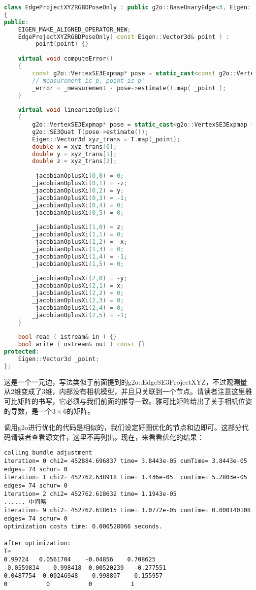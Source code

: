 \begin{lstlisting}[language=c++,caption=slambook/ch7/pose\_estimation\_3d3d.cpp]
class EdgeProjectXYZRGBDPoseOnly : public g2o::BaseUnaryEdge<3, Eigen::Vector3d, g2o::VertexSE3Expmap>
{
public:
	EIGEN_MAKE_ALIGNED_OPERATOR_NEW;
	EdgeProjectXYZRGBDPoseOnly( const Eigen::Vector3d& point ) :
		_point(point) {}
	
	virtual void computeError()
	{
		const g2o::VertexSE3Expmap* pose = static_cast<const g2o::VertexSE3Expmap*> ( _vertices[0] );
		// measurement is p, point is p'
		_error = _measurement - pose->estimate().map( _point );
	}
	
	virtual void linearizeOplus()
	{
		g2o::VertexSE3Expmap* pose = static_cast<g2o::VertexSE3Expmap *>(_vertices[0]);
		g2o::SE3Quat T(pose->estimate());
		Eigen::Vector3d xyz_trans = T.map(_point);
		double x = xyz_trans[0];
		double y = xyz_trans[1];
		double z = xyz_trans[2];
		
		_jacobianOplusXi(0,0) = 0;
		_jacobianOplusXi(0,1) = -z;
		_jacobianOplusXi(0,2) = y;
		_jacobianOplusXi(0,3) = -1;
		_jacobianOplusXi(0,4) = 0;
		_jacobianOplusXi(0,5) = 0;
		
		_jacobianOplusXi(1,0) = z;
		_jacobianOplusXi(1,1) = 0;
		_jacobianOplusXi(1,2) = -x;
		_jacobianOplusXi(1,3) = 0;
		_jacobianOplusXi(1,4) = -1;
		_jacobianOplusXi(1,5) = 0;
		
		_jacobianOplusXi(2,0) = -y;
		_jacobianOplusXi(2,1) = x;
		_jacobianOplusXi(2,2) = 0;
		_jacobianOplusXi(2,3) = 0;
		_jacobianOplusXi(2,4) = 0;
		_jacobianOplusXi(2,5) = -1;
	}
	
	bool read ( istream& in ) {}
	bool write ( ostream& out ) const {}
protected:
	Eigen::Vector3d _point;
};
\end{lstlisting}

这是一个一元边，写法类似于前面提到的g2o::EdgeSE3ProjectXYZ，不过观测量从2维变成了3维，内部没有相机模型，并且只关联到一个节点。请读者注意这里雅可比矩阵的书写，它必须与我们前面的推导一致。雅可比矩阵给出了关于相机位姿的导数，是一个$3 \times 6$的矩阵。

调用g2o进行优化的代码是相似的，我们设定好图优化的节点和边即可。这部分代码请读者查看源文件，这里不再列出。现在，来看看优化的结果：

\begin{lstlisting}
calling bundle adjustment
iteration= 0 chi2= 452884.696837 time= 3.8443e-05 cumTime= 3.8443e-05  edges= 74 schur= 0
iteration= 1 chi2= 452762.638918 time= 1.436e-05  cumTime= 5.2803e-05  edges= 74 schur= 0
iteration= 2 chi2= 452762.618632 time= 1.1943e-05	 
...... 中间略
iteration= 9 chi2= 452762.618615 time= 1.0772e-05 cumTime= 0.000140108 edges= 74 schur= 0
optimization costs time: 0.000528066 seconds.

after optimization:
T=
0.99724   0.0561704    -0.04856    0.708625
-0.0559834    0.998418  0.00520239   -0.277551
0.0487754 -0.00246948    0.998807   -0.155957
0           0           0           1
\end{lstlisting}

